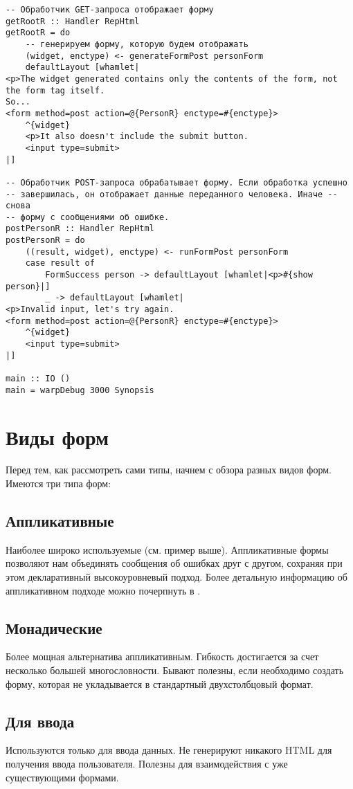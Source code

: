 \begin{lstlisting}
-- Обработчик GET-запроса отображает форму
getRootR :: Handler RepHtml
getRootR = do
    -- генерируем форму, которую будем отображать
    (widget, enctype) <- generateFormPost personForm
    defaultLayout [whamlet|
<p>The widget generated contains only the contents of the form, not the form tag itself.
So...
<form method=post action=@{PersonR} enctype=#{enctype}>
    ^{widget}
    <p>It also doesn't include the submit button.
    <input type=submit>
|]

-- Обработчик POST-запроса обрабатывает форму. Если обработка успешно 
-- завершилась, он отображает данные переданного человека. Иначе -- снова
-- форму с сообщениями об ошибке.
postPersonR :: Handler RepHtml
postPersonR = do
    ((result, widget), enctype) <- runFormPost personForm
    case result of
        FormSuccess person -> defaultLayout [whamlet|<p>#{show person}|]
        _ -> defaultLayout [whamlet|
<p>Invalid input, let's try again.
<form method=post action=@{PersonR} enctype=#{enctype}>
    ^{widget}
    <input type=submit>
|]

main :: IO ()
main = warpDebug 3000 Synopsis
\end{lstlisting}

\section{Виды форм}
Перед тем, как рассмотреть сами типы, начнем с обзора разных видов форм. Имеются три типа
форм:

\subsection{Аппликативные}
Наиболее широко используемые (см. пример выше). Аппликативные формы
позволяют нам объединять сообщения об ошибках друг с другом, сохраняя при этом
декларативный высокоуровневый подход. Более детальную информацию об аппликативном подходе
можно почерпнуть в 
.

\subsection{Монадические}
Более мощная альтернатива аппликативным. Гибкость достигается за счет несколько большей
многословности. Бывают полезны, если необходимо создать форму, которая не укладывается в
стандартный двухстолбцовый формат.

\subsection{Для ввода}
Используются только для ввода данных. Не генерируют никакого HTML для получения ввода
пользователя. Полезны для взаимодействия с уже существующими формами.

